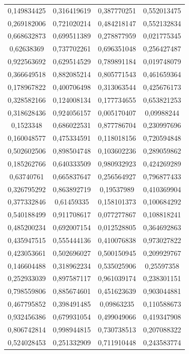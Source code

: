 \documentclass[a4paper,12pt]{article}
\begin{document}
\begin{longtable}{|c|c|c|c|}
0,149834425 & 0,316419619 & 0,387770251 & 0,552013475 \\
0,269182006 & 0,721020214 & 0,484218147 & 0,552132834 \\
0,668632873 & 0,699511389 & 0,278877959 & 0,021775345 \\
0,62638369 & 0,737702261 & 0,696351048 & 0,256427487 \\
0,922563692 & 0,629514529 & 0,789891184 & 0,019748079 \\
0,366649518 & 0,882085214 & 0,805771543 & 0,461659364 \\
0,178967822 & 0,400706498 & 0,313063544 & 0,425676173 \\
0,328582166 & 0,124008134 & 0,177734655 & 0,653821253 \\
0,318628436 & 0,924056157 & 0,005170407 & 0,09988244 \\
0,1523348 & 0,686022531 & 0,877786704 & 0,230997696 \\
0,160048577 & 0,475334591 & 0,118018156 & 0,720594848 \\
0,502602506 & 0,898504748 & 0,103602236 & 0,289059862 \\
0,185262766 & 0,640333509 & 0,980932923 & 0,424269289 \\
0,63740761 & 0,665837647 & 0,256564927 & 0,796877433 \\
0,326795292 & 0,863892719 & 0,19537989 & 0,410369904 \\
0,377332846 & 0,61459335 & 0,158101373 & 0,100684292 \\
0,540188499 & 0,911708617 & 0,077277867 & 0,108818241 \\
0,485200234 & 0,692007154 & 0,012528805 & 0,364692863 \\
0,435947515 & 0,555444136 & 0,410076838 & 0,973027822 \\
0,423053661 & 0,502696027 & 0,500150945 & 0,209929767 \\
0,146604488 & 0,318962234 & 0,535025906 & 0,25597358 \\
0,252933039 & 0,897587117 & 0,961039174 & 0,238301151 \\
0,798559806 & 0,885674601 & 0,451623639 & 0,903044881 \\
0,467795852 & 0,398491485 & 0,09863235 & 0,110588673 \\
0,932456386 & 0,679931054 & 0,499049066 & 0,419347908 \\
0,806742814 & 0,998944815 & 0,730738513 & 0,207088322 \\
0,524028453 & 0,251332909 & 0,711910448 & 0,243583774 \\

\end{longtable}
\end{document}
